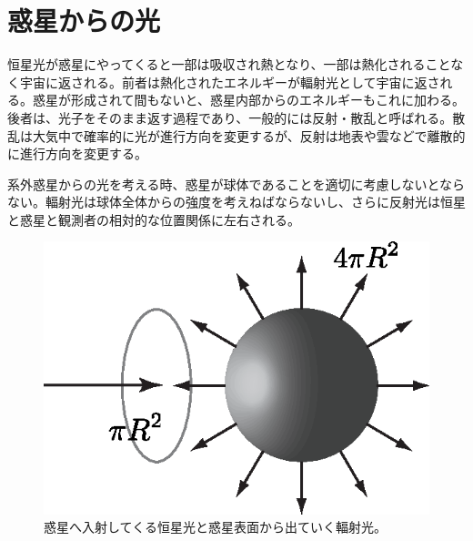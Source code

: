 \section{惑星からの光}

恒星光が惑星にやってくると一部は吸収され熱となり、一部は熱化されることなく宇宙に返される。前者は熱化されたエネルギーが輻射光として宇宙に返される。惑星が形成されて間もないと、惑星内部からのエネルギーもこれに加わる。後者は、光子をそのまま返す過程であり、一般的には反射・散乱と呼ばれる。散乱は大気中で確率的に光が進行方向を変更するが、反射は地表や雲などで離散的に進行方向を変更する。

系外惑星からの光を考える時、惑星が球体であることを適切に考慮しないとならない。輻射光は球体全体からの強度を考えねばならないし、さらに反射光は恒星と惑星と観測者の相対的な位置関係に左右される。



\begin{figure}[h]
 \begin{center}
	\includegraphics[width=\linewidth]{fig/io.eps}
\end{center}
	\caption{惑星へ入射してくる恒星光と惑星表面から出ていく輻射光。}
	\label{fig:io}
\end{figure} 

